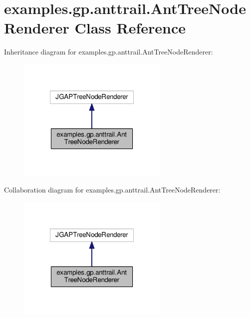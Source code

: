 \hypertarget{classexamples_1_1gp_1_1anttrail_1_1_ant_tree_node_renderer}{\section{examples.\-gp.\-anttrail.\-Ant\-Tree\-Node\-Renderer Class Reference}
\label{classexamples_1_1gp_1_1anttrail_1_1_ant_tree_node_renderer}
}


Inheritance diagram for examples.\-gp.\-anttrail.\-Ant\-Tree\-Node\-Renderer\-:
\nopagebreak
\begin{figure}[H]
\begin{center}
\leavevmode
\includegraphics[width=204pt]{classexamples_1_1gp_1_1anttrail_1_1_ant_tree_node_renderer__inherit__graph}
\end{center}
\end{figure}


Collaboration diagram for examples.\-gp.\-anttrail.\-Ant\-Tree\-Node\-Renderer\-:
\nopagebreak
\begin{figure}[H]
\begin{center}
\leavevmode
\includegraphics[width=204pt]{classexamples_1_1gp_1_1anttrail_1_1_ant_tree_node_renderer__coll__graph}
\end{center}
\end{figure}
